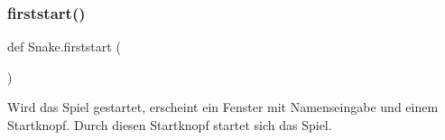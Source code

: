 \subsubsection{\texorpdfstring{firststart()}{firststart()}}
{\footnotesize\ttfamily def Snake.\+firststart (\begin{DoxyParamCaption}{ }\end{DoxyParamCaption})}

\begin{DoxyVerb}Wird das Spiel gestartet, erscheint ein Fenster mit Namenseingabe und einem Startknopf.
Durch diesen Startknopf startet sich das Spiel.
\end{DoxyVerb}
 